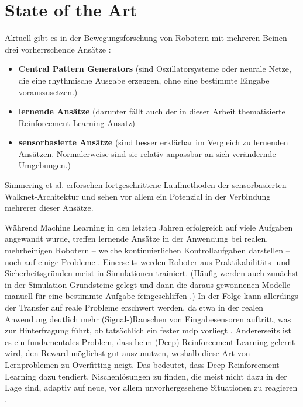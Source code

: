 \chapter{State of the Art}
Aktuell gibt es in der Bewegungsforschung von Robotern mit mehreren Beinen drei vorherrschende Ansätze \cite{simmering2023walknet}:
\begin{itemize}
    \item \textbf{Central Pattern Generators} (sind Oszillatorsysteme oder neurale Netze, die eine rhythmische Ausgabe erzeugen, ohne eine bestimmte Eingabe vorauszusetzen.)
    \item \textbf{lernende Ansätze} (darunter fällt auch der in dieser Arbeit thematisierte Reinforcement Learning Ansatz)
    \item \textbf{sensorbasierte Ansätze} (sind besser erklärbar im Vergleich zu lernenden Ansätzen. Normalerweise sind sie relativ anpassbar an sich verändernde Umgebungen.)
\end{itemize}
Simmering et al. \cite{simmering2023walknet} erforschen fortgeschrittene Laufmethoden der sensorbasierten Walknet-Architektur und sehen vor allem ein Potenzial in der Verbindung mehrerer dieser Ansätze.

Während Machine Learning in den letzten Jahren erfolgreich auf viele Aufgaben angewandt wurde, treffen lernende Ansätze in der Anwendung bei realen, mehrbeinigen Robotern -- welche kontinuierlichen Kontrollaufgaben darstellen -- noch auf einige Probleme \cite{schilling2020decentralized}.
Einerseits werden Roboter aus Praktikabilitäts- und Sicherheitsgründen meist in Simulationen trainiert.
(Häufig werden auch zunächst in der Simulation Grundsteine gelegt und dann die daraus gewonnenen Modelle manuell für eine bestimmte Aufgabe feingeschliffen \cite{schilling2020decentralized}.)
In der Folge kann allerdings der Transfer auf reale Probleme erschwert werden, da etwa in der realen Anwendung deutlich mehr (Signal-)Rauschen von Eingabesensoren auftritt, was zur Hinterfragung führt, ob tatsächlich ein fester \ac{mdp} vorliegt \cite{schilling2020decentralized}.
Andererseits ist es ein fundamentales Problem, dass beim (Deep) Reinforcement Learning gelernt wird, den Reward möglichst gut auszunutzen, weshalb diese Art von Lernproblemen zu Overfitting neigt.
Das bedeutet, dass Deep Reinforcement Learning dazu tendiert, Nischenlösungen zu finden, die meist nicht dazu in der Lage sind, adaptiv auf neue, vor allem unvorhergesehene Situationen zu reagieren \cite{schilling2020decentralized}.

